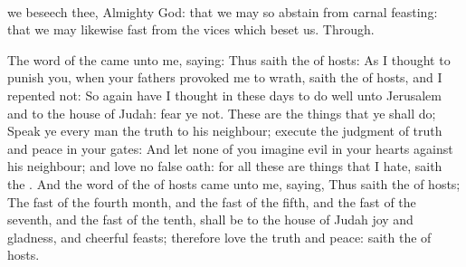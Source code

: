 \\


\vspace{-0.2\baselineskip}

\collect

\vspace{-0.1\baselineskip}

 we beseech thee, Almighty God: that we may so abstain from carnal feasting: that we may likewise fast from the vices which beset us. Through.


\vspace{-0.2\baselineskip}

 The word of the  came unto me, saying: Thus saith the  of hosts: As I thought to punish you, when your fathers provoked me to wrath, saith the  of hosts, and I repented not: So again have I thought in these days to do well unto Jerusalem and to the house of Judah: fear ye not. These are the things that ye shall do; Speak ye every man the truth to his neighbour; execute the judgment of truth and peace in your gates: And let none of you imagine evil in your hearts against his neighbour; and love no false oath: for all these are things that I hate, saith the . And the word of the  of hosts came unto me, saying, Thus saith the  of hosts; The fast of the fourth month, and the fast of the fifth, and the fast of the seventh, and the fast of the tenth, shall be to the house of Judah joy and gladness, and cheerful feasts; therefore love the truth and peace: saith the  of hosts.

\\


\vspace{-0.4\baselineskip}

